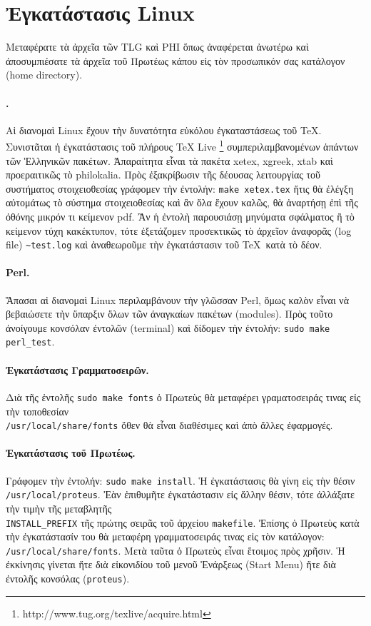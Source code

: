 \documentclass[12pt,a4paper]{article}
\begin{document}
\section{Ἐγκατάστασις Linux}
    Μεταφέρατε τὰ ἀρχεῖα τῶν TLG καὶ PHI ὅπως ἀναφέρεται ἀνωτέρω
    καὶ ἀποσυμπιέσατε τὰ ἀρχεῖα τοῦ Πρωτέως κάπου εἰς τὸν προσωπικόν σας
    κατάλογον (home directory).

    \paragraph{\XeTeX.}
      Αἱ διανομαὶ Linux ἔχουν τὴν δυνατότητα εὐκόλου ἐγκαταστάσεως τοῦ
      \TeX.  Συνιστᾶται  ἡ ἐγκατάστασις τοῦ πλήρους TeX Live
      \footnote{http://www.tug.org/texlive/acquire.html}
      συμπεριλαμβανομένων ἁπάντων τῶν Ἑλληνικῶν πακέτων.
      Ἀπαραίτητα εἶναι τὰ πακέτα xetex, xgreek, xtab καὶ προεραιτικῶς τὸ philokalia.
      Πρὸς ἐξακρίβωσιν τῆς δέουσας λειτουργίας τοῦ συστήματος στοιχειοθεσίας
      γράφομεν τὴν ἐντολήν: {\tt make xetex.tex} ἥτις θὰ ἐλέγξη αὐτομάτως
      τὸ σύστημα στοιχειοθεσίας καὶ ἂν ὅλα ἔχουν καλῶς,
      θὰ ἀναρτήσῃ ἐπὶ τῆς ὀθόνης μικρόν τι κείμενον pdf.
      Ἂν ἡ ἐντολὴ παρουσιάσῃ μηνύματα σφάλματος ἢ τὸ κείμενον
      τύχη κακέκτυπον, τότε ἐξετάζομεν προσεκτικῶς τὸ ἀρχεῖον
      ἀναφορᾶς (log file) {\tt \~{}test.log} καὶ ἀναθεωροῦμε
      τὴν ἐγκατάστασιν τοῦ \TeX\ κατὰ τὸ δέον.
    \paragraph{Perl.}
      Ἅπασαι αἱ διανομαὶ Linux περιλαμβάνουν τὴν γλῶσσαν Perl,
      ὅμως καλὸν εἶναι νὰ βεβαιώσετε τὴν ὕπαρξιν ὅλων τῶν ἀναγκαίων
      πακέτων (modules). Πρὸς τοῦτο ἀνοίγουμε κονσόλαν ἐντολῶν (terminal)
      καὶ δίδομεν τὴν  ἐντολήν: {\tt sudo make perl\_test}.
      \paragraph{Ἐγκατάστασις Γραμματοσειρῶν.} Διὰ τῆς ἐντολῆς {\tt sudo
      make fonts} ὁ Πρωτεὺς θὰ μεταφέρει γραματοσειράς τινας εἰς τὴν
      τοποθεσίαν\\ {\tt /usr/local/share/fonts} ὅθεν θὰ εἶναι διαθέσιμες καὶ
      ἀπὸ ἄλλες ἐφαρμογές.
    \paragraph{Ἐγκατάστασις τοῦ Πρωτέως.}
      Γράφομεν τὴν ἐντολήν: {\tt sudo make install}.
      Ἡ ἐγκατάστασις θὰ γίνη εἰς τὴν θέσιν {\tt /usr/local/proteus}.
      Ἐὰν ἐπιθυμῆτε ἐγκατάστασιν εἰς ἄλλην θέσιν, τότε ἀλλάξατε τὴν τιμὴν
      τῆς μεταβλητῆς\\ {\tt INSTALL\_PREFIX} τῆς πρώτης σειρᾶς τοῦ ἀρχείου
    {\tt makefile}. Ἐπίσης ὁ Πρωτεὺς κατὰ τὴν ἐγκατάστασίν του θὰ μεταφέρη
      γραμματοσειράς τινας εἰς τὸν κατάλογον: {\tt /usr/local/share/fonts}.
      Μετὰ ταῦτα ὁ Πρωτεὺς εἶναι ἕτοιμος πρὸς χρῆσιν. Ἡ ἐκκίνησις γίνεται
      ἤτε διὰ εἰκονιδίου τοῦ μενοῦ Ἐνάρξεως (Start Menu) ἤτε διὰ ἐντολῆς
      κονσόλας ({\tt proteus}).
\end{document}
